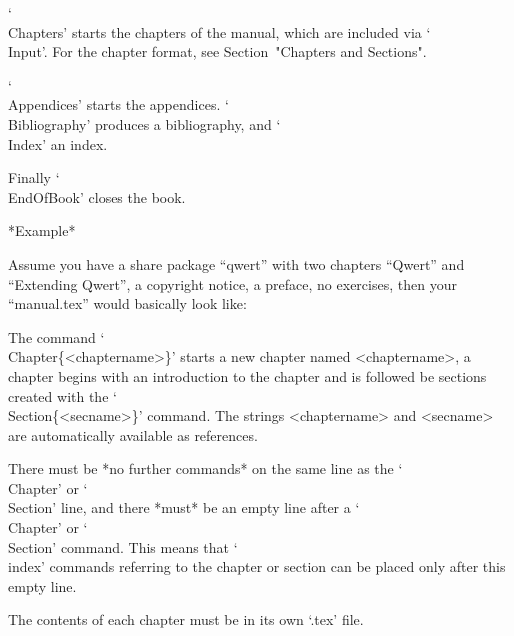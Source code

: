 `\\Chapters'  starts the chapters  of the manual,  which are included via
`\\Input'.  For the chapter format, see Section~"Chapters and Sections".

`\\Appendices'  starts the appendices.
`\\Bibliography'  produces a bibliography, and `\\Index' an index.

Finally `\\EndOfBook' closes the book.

*Example*

Assume you have a share package ``qwert'' with two chapters ``Qwert'' and
``Extending  Qwert'', a copyright  notice,  a preface, no exercises, then
your ``manual.tex'' would basically look like:

\begintt

  \TableOfContents
  \FrontMatter
  \Chapters
  \Appendices
    \Index
\EndOfBook
\endtt


The command `\\Chapter\{<chaptername>\}' starts a new chapter named
<chaptername>, a chapter begins with an introduction to the chapter and
is followed be sections created with the `\\Section\{<secname>\}'
command. The strings <chaptername> and <secname> are automatically
available as references.

There must be *no further commands* on the same line as the `\\Chapter'
or `\\Section' line,
and there *must* be an empty line after a `\\Chapter' or `\\Section'
command.
This means that `\\index' commands referring to the chapter or section
can be placed only after this empty line.

The contents of each chapter must be in its own `.tex' file.

